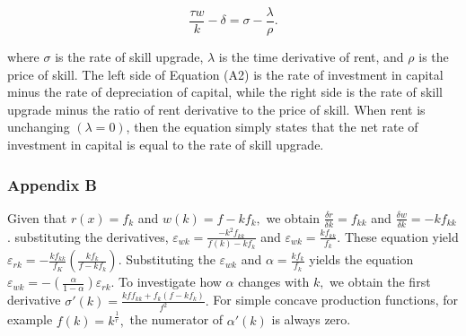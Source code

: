 \documentclass[
  a4paper,
  DIV=11,
  numbers=noendperiod]{scrartcl}
\begin{document}
\[
\frac{\tau w}{k}-\delta=\sigma- \frac{\lambda}{\rho}. \tag{A2}
\]

where \(\sigma\) is the rate of skill upgrade, \(\lambda\) is the time
derivative of rent, and \(\rho\) is the price of skill. The left side of
Equation (A2) is the rate of investment in capital minus the rate of
depreciation of capital, while the right side is the rate of skill
upgrade minus the ratio of rent derivative to the price of skill. When
rent is unchanging \((\lambda=0)\), then the equation simply states that
the net rate of investment in capital is equal to the rate of skill
upgrade.

\hypertarget{appendix-b}{%
\subsubsection*{Appendix B}\label{appendix-b}}

Given that \(r(x)=f_k\) and \(w(k)=f-kf_k,\) we obtain
\(\frac{\delta r}{\delta k}=f_{kk}\) and
\(\frac{\delta w}{\delta k}= -kf_{kk}\). substituting the derivatives,
\(\varepsilon_{wk}=\frac{-k^2 f_{kk}}{f(k)-kf_k}\) and
\(\varepsilon_{wk}=\frac{kf_{kk}}{f_k}\). These equation yield
\(\varepsilon_{rk}= -\frac{kf_{kk}}{f_K} \left(\frac{kf_k}{f-kf_k}\right).\)
Substituting the \(\varepsilon_{wk}\) and \(\alpha = \frac{kf_k}{f_k}\)
yields the equation
\(\varepsilon_{wk}=- \left( \frac {\alpha}{1-\alpha} \right) \varepsilon_{rk}\).
To investigate how \(\alpha\) changes with \(k,\) we obtain the first
derivative \(\sigma'(k)=\frac{kff_{kk} +f_k(f-kf_k)}{f^2}.\) For simple
concave production functions, for example \(f(k)=k^\frac{1}{r},\) the
numerator of \(\alpha'(k)\) is always zero.

\newpage{}
\end{document}
